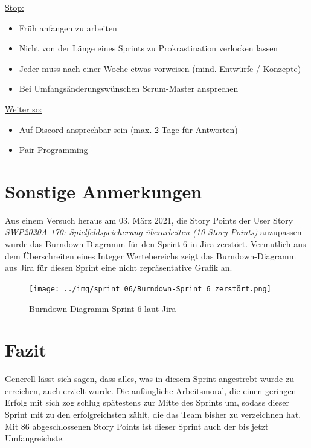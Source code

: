 \documentclass[12pt,a4paper, oneside]{article}
\begin{document}
\underline{Stop:}
\begin{itemize}
    \item Früh anfangen zu arbeiten
    \item Nicht von der Länge eines Sprints zu Prokrastination verlocken lassen
    \item Jeder muss nach einer Woche etwas vorweisen (mind. Entwürfe / Konzepte)
    \item Bei Umfangsänderungswünschen Scrum-Master ansprechen
    \\
\end{itemize}

\underline{Weiter so:}
\begin{itemize}
    \item Auf Discord ansprechbar sein (max. 2 Tage für Antworten)
    \item Pair-Programming


\end{itemize}

\newpage

\section{Sonstige Anmerkungen}

Aus einem Versuch heraus am 03. März 2021, die Story Points der User Story \textit{ SWP2020A-170: Spielfeldspeicherung überarbeiten (10 Story Points)} anzupassen wurde das Burndown-Diagramm für den Sprint 6 in Jira zerstört. Vermutlich aus dem Überschreiten eines Integer Wertebereichs zeigt das Burndown-Diagramm aus Jira für diesen Sprint eine nicht repräsentative Grafik an.

\begin{figure}[h]
    \centering
    \texttt{[image: ../img/sprint\_06/Burndown-Sprint 6\_zerstört.png]}
    \caption{Burndown-Diagramm Sprint 6 laut Jira}
    \label{fig: Burndown-Sprint6_zerstört}
\end{figure}



\section{Fazit}
Generell lässt sich sagen, dass alles, was in diesem Sprint angestrebt wurde zu erreichen, auch erzielt wurde. Die anfängliche Arbeitsmoral, die einen geringen Erfolg mit sich zog schlug spätestens zur Mitte des Sprints um, sodass dieser Sprint mit zu den erfolgreichsten zählt, die das Team bisher zu verzeichnen hat. Mit 86 abgeschlossenen Story Points ist dieser Sprint auch der bis jetzt Umfangreichste.
\end{document}
